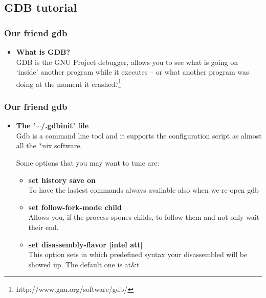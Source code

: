 \documentclass[]{beamer}
\begin{document}
\subsection{GDB tutorial}
        \begin{frame}
        \frametitle{Our friend gdb}
        \begin{itemize}
            \item{{\bf What is GDB?}}\\
            GDB is the GNU Project debugger, allows you to see what is going on `inside' another program while it executes -- or what another program was doing at the moment it crashed.`\footnote{http://www.gnu.org/software/gdb/}
        \end{itemize}
      \end{frame}
      \begin{frame}
        \frametitle{Our friend gdb}
        \begin{itemize}
            \item{{\bf The '$\sim$/.gdbinit' file}}\\
            Gdb is a command line tool and it supports the configuration script as almost all the *nix software.

            Some options that you may want to tune are:
            \begin{itemize}
                \item{{\bf set history save on}}\\
                To have the lastest commands always available also when we re-open gdb
                \item{{\bf set follow-fork-mode child}}\\
                Allows you, if the process spones childs, to follow them and not only wait their end.
                \item{{\bf set disassembly-flavor [intel \textpipe{}  att]}}\\
                This option sets in which predefined syntax your disassembled will be showed up. The default one is at\&t
            \end{itemize}
        \end{itemize}
      \end{frame}
\end{document}
